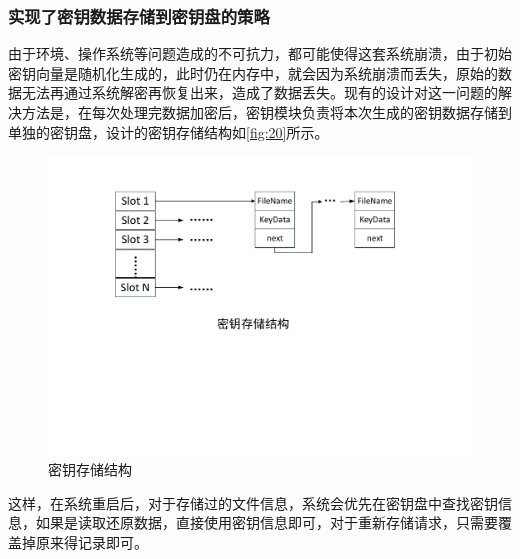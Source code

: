 \subsubsection{实现了密钥数据存储到密钥盘的策略}
由于环境、操作系统等问题造成的不可抗力，都可能使得这套系统崩溃，由于初始密钥向量是随机化生成的，此时仍在内存中，就会因为系统崩溃而丢失，原始的数据无法再通过系统解密再恢复出来，造成了数据丢失。现有的设计对这一问题的解决方法是，在每次处理完数据加密后，密钥模块负责将本次生成的密钥数据存储到单独的密钥盘，设计的密钥存储结构如\autoref{fig:20}所示。
\begin{figure}[H]
	\centering
	\includegraphics[width=1\textwidth]{Pics/keystore.pdf}
	\caption{密钥存储结构}
	\label{fig:20}
\end{figure}
这样，在系统重启后，对于存储过的文件信息，系统会优先在密钥盘中查找密钥信息，如果是读取还原数据，直接使用密钥信息即可，对于重新存储请求，只需要覆盖掉原来得记录即可。
